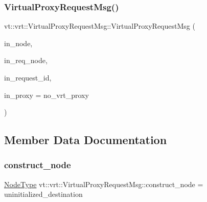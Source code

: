\subsubsection{\texorpdfstring{Virtual\+Proxy\+Request\+Msg()}{VirtualProxyRequestMsg()}}
{\footnotesize\ttfamily vt\+::vrt\+::\+Virtual\+Proxy\+Request\+Msg\+::\+Virtual\+Proxy\+Request\+Msg (\begin{DoxyParamCaption}\item[{\hyperlink{namespacevt_a866da9d0efc19c0a1ce79e9e492f47e2}{Node\+Type} const \&}]{in\+\_\+node,  }\item[{\hyperlink{namespacevt_a866da9d0efc19c0a1ce79e9e492f47e2}{Node\+Type} const \&}]{in\+\_\+req\+\_\+node,  }\item[{\hyperlink{namespacevt_1_1vrt_ac7ef8820ebfc383fa16f09bf46eaa2b8}{Virtual\+Request\+I\+D\+Type} const \&}]{in\+\_\+request\+\_\+id,  }\item[{\hyperlink{namespacevt_a1b417dd5d684f045bb58a0ede70045ac}{Virtual\+Proxy\+Type} const \&}]{in\+\_\+proxy = {\ttfamily no\+\_\+vrt\+\_\+proxy} }\end{DoxyParamCaption})\hspace{0.3cm}{\ttfamily [inline]}}



\subsection{Member Data Documentation}
\mbox{\label{structvt_1_1vrt_1_1_virtual_proxy_request_msg_ae57a7fa0849abff9b9c94206fa458de5}} 
\subsubsection{\texorpdfstring{construct\+\_\+node}{construct\_node}}
{\footnotesize\ttfamily \hyperlink{namespacevt_a866da9d0efc19c0a1ce79e9e492f47e2}{Node\+Type} vt\+::vrt\+::\+Virtual\+Proxy\+Request\+Msg\+::construct\+\_\+node = uninitialized\+\_\+destination}

\mbox{\label{structvt_1_1vrt_1_1_virtual_proxy_request_msg_ae7e2b6629045422a7a1fee6dc6b84d1f}} 
